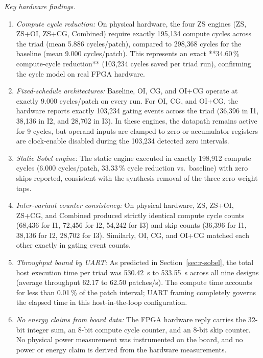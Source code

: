 \documentclass[11pt,journal,draftclsnofoot,onecolumn]{IEEEtran}
\begin{document}
\emph{Key hardware findings.}
\begin{enumerate}
\item \emph{Compute cycle reduction:} On physical hardware, the four ZS engines (ZS, ZS+OI,
ZS+CG, Combined) require exactly 195{,}134 compute cycles across the triad (mean 5.886
cycles/patch), compared to 298{,}368 cycles for the baseline (mean 9.000 cycles/patch).
This represents an exact **34.60\,\% compute-cycle reduction** (103{,}234 cycles saved per
triad run), confirming the cycle model on real FPGA hardware.
\item \emph{Fixed-schedule architectures:} Baseline, OI, CG, and OI+CG operate at exactly
9.000 cycles/patch on every run. For OI, CG, and OI+CG, the hardware reports exactly 103{,}234
gating events across the triad (36{,}396 in I1, 38{,}136 in I2, and 28{,}702 in I3).
In these engines, the datapath remains active for 9 cycles, but operand inputs are
clamped to zero or accumulator registers are clock-enable disabled during the 103{,}234
detected zero intervals.
\item \emph{Static Sobel engine:} The static engine executed in exactly 198{,}912 compute
cycles (6.000 cycles/patch, 33.33\,\% cycle reduction vs.\ baseline) with zero skips
reported, consistent with the synthesis removal of the three zero-weight taps.
\item \emph{Inter-variant counter consistency:} On physical hardware, ZS, ZS+OI, ZS+CG,
and Combined produced strictly identical compute cycle counts (68{,}436 for I1, 72{,}456
for I2, 54{,}242 for I3) and skip counts (36{,}396 for I1, 38{,}136 for I2, 28{,}702 for
I3). Similarly, OI, CG, and OI+CG matched each other exactly in gating event counts.
\item \emph{Throughput bound by UART:} As predicted in Section~\ref{sec:r-sobel}, the
total host execution time per triad was 530.42~s to 533.55~s across all nine designs
(average throughput 62.17 to 62.50 patches/s). The compute time accounts for less than
0.01\,\% of the patch interval; UART framing completely governs the elapsed time in this
host-in-the-loop configuration.
\item \emph{No energy claims from board data:} The FPGA hardware reply carries the 32-bit
integer sum, an 8-bit compute cycle counter, and an 8-bit skip counter. No physical power
measurement was instrumented on the board, and no power or energy claim is derived from
the hardware measurements.
\end{enumerate}
\end{document}
